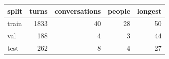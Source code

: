 \begin{tabular}{@{}lrrrr@{}}
\toprule
split & turns & conversations & people & longest \\
\midrule
train & 1833 & 40 & 28 & 50 \\
val & 188 & 4 & 3 & 44 \\
test & 262 & 8 & 4 & 27 \\
\bottomrule
\end{tabular}
